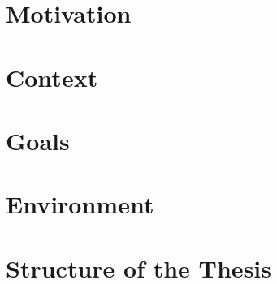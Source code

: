 

\section{Motivation}
\section{Context}
\section{Goals}
\section{Environment}
\section{Structure of the Thesis}


